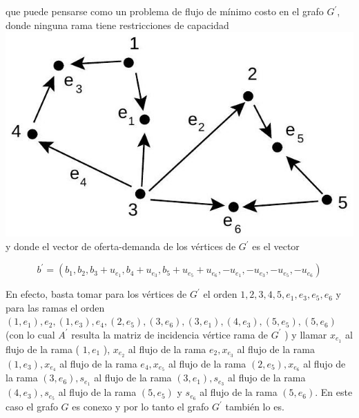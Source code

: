 \documentclass[10pt]{article}
\begin{document}
que puede pensarse como un problema de flujo de mínimo costo en el grafo $G^{\prime}$, donde ninguna rama tiene restricciones de capacidad\\
\includegraphics[max width=\textwidth, center]{2025_09_05_955b52bfc43174a24a9ag-19}\\
y donde el vector de oferta-demanda de los vértices de $G^{\prime}$ es el vector

$$
b^{\prime}=\left(b_{1}, b_{2}, b_{3}+u_{e_{1}}, b_{4}+u_{e_{3}}, b_{5}+u_{e_{5}}+u_{e_{6}},-u_{e_{1}},-u_{e_{3}},-u_{e_{5}},-u_{e_{6}}\right)
$$

En efecto, basta tomar para los vértices de $G^{\prime}$ el orden $1,2,3,4,5, e_{1}, e_{3}, e_{5}, e_{6}$ y para las ramas el orden $\left(1, e_{1}\right), e_{2},\left(1, e_{3}\right), e_{4},\left(2, e_{5}\right),\left(3, e_{6}\right),\left(3, e_{1}\right),\left(4, e_{3}\right),\left(5, e_{5}\right),\left(5, e_{6}\right)$ (con lo cual $A^{\prime}$ resulta la matriz de incidencia vértice rama de $G^{\prime}$ ) y llamar $x_{e_{1}}$ al flujo de la rama ( $1, e_{1}$ ), $x_{e_{2}}$ al flujo de la rama $e_{2}, x_{e_{3}}$ al flujo de la rama $\left(1, e_{3}\right), x_{e_{4}}$ al flujo de la rama $e_{4}, x_{e_{5}}$ al flujo de la rama $\left(2, e_{5}\right), x_{e_{6}}$ al flujo de la rama $\left(3, e_{6}\right), s_{e_{1}}$ al flujo de la rama $\left(3, e_{1}\right), s_{e_{3}}$ al flujo de la rama $\left(4, e_{3}\right), s_{e_{5}}$ al flujo de la rama $\left(5, e_{5}\right)$ y $s_{e_{6}}$ al flujo de la rama $\left(5, e_{6}\right)$. En este caso el grafo $G$ es conexo y por lo tanto el grafo $G^{\prime}$ también lo es.
\end{document}
